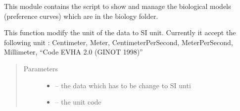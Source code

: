 \documentclass[letterpaper,10pt,english]{sphinxmanual}
\begin{document}
This module contains the script to show and manage the biological models (preference curves) which are in the biology folder.
\label{\detokenize{index:module-src.bio_info}}

\begin{fulllineitems}
\label{\detokenize{index:src.bio_info.change_unit}}
This function modify the unit of the data to SI unit. Currently it accept the following unit :
Centimeter, Meter, CentimeterPerSecond, MeterPerSecond, Millimeter, ``Code EVHA 2.0 (GINOT 1998)''
\begin{quote}\begin{description}
\item[{Parameters}] \leavevmode\begin{itemize}
\item {} 
 -- the data which has to be change to SI unti

\item {} 
 -- the unit code

\end{itemize}

\end{description}\end{quote}

\end{fulllineitems}

\end{document}
